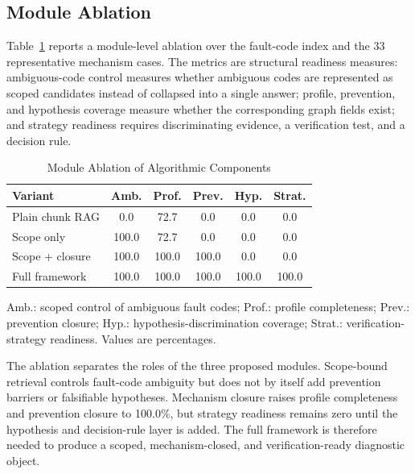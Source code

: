 \documentclass[lettersize,journal]{IEEEtran}
\begin{document}
\subsection{Module Ablation}
Table~\ref{tab:module_ablation} reports a module-level ablation over the fault-code index and the 33 representative mechanism cases. The metrics are structural readiness measures: ambiguous-code control measures whether ambiguous codes are represented as scoped candidates instead of collapsed into a single answer; profile, prevention, and hypothesis coverage measure whether the corresponding graph fields exist; and strategy readiness requires discriminating evidence, a verification test, and a decision rule.

\begin{table}[htbp]
\caption{Module Ablation of Algorithmic Components}
\label{tab:module_ablation}
\centering
\scriptsize
\begin{tabular}{lccccc}
\toprule
Variant & Amb. & Prof. & Prev. & Hyp. & Strat. \\
\midrule
Plain chunk RAG & 0.0 & 72.7 & 0.0 & 0.0 & 0.0 \\
Scope only & 100.0 & 72.7 & 0.0 & 0.0 & 0.0 \\
Scope + closure & 100.0 & 100.0 & 100.0 & 0.0 & 0.0 \\
Full framework & 100.0 & 100.0 & 100.0 & 100.0 & 100.0 \\
\bottomrule
\end{tabular}
\vspace{1mm}
\begin{flushleft}
\scriptsize Amb.: scoped control of ambiguous fault codes; Prof.: profile completeness; Prev.: prevention closure; Hyp.: hypothesis-discrimination coverage; Strat.: verification-strategy readiness. Values are percentages.
\end{flushleft}
\end{table}

The ablation separates the roles of the three proposed modules. Scope-bound retrieval controls fault-code ambiguity but does not by itself add prevention barriers or falsifiable hypotheses. Mechanism closure raises profile completeness and prevention closure to 100.0\%, but strategy readiness remains zero until the hypothesis and decision-rule layer is added. The full framework is therefore needed to produce a scoped, mechanism-closed, and verification-ready diagnostic object.
\end{document}
